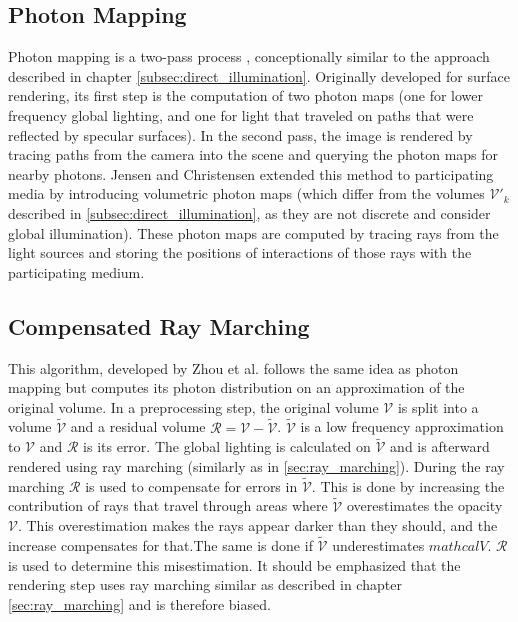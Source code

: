 \subsection{Photon Mapping}
Photon mapping is a two-pass process \cite{10.1145/280814.280925}, conceptionally similar to the approach described in chapter \ref{subsec:direct_illumination}. Originally developed for surface rendering\cite{10.5555/275458.275461}, its first step is the computation of two photon maps\cite{10.1145/280814.280925} (one for lower frequency global lighting, and one for light that traveled on paths that were reflected by specular surfaces). In the second pass, the image is rendered by tracing paths from the camera into the scene and querying the photon maps for nearby photons.
Jensen and Christensen \cite{10.1145/280814.280925} extended this method to participating media by introducing volumetric photon maps (which differ from the volumes $\mathcal{V}'_k$ described in \ref{subsec:direct_illumination}, as they are not discrete and consider global illumination). These photon maps are computed by tracing rays from the light sources and storing the positions of interactions of those rays with the participating medium.
\subsection{Compensated Ray Marching}
This algorithm, developed by Zhou et al. \cite{zhou2007real-time} follows the same idea as photon mapping but computes its photon distribution on an approximation of the original volume.
In a preprocessing step, the original volume $\mathcal{V}$ is split into a volume $\widetilde{\mathcal{V}}$ and a residual volume $\mathcal{R} = \mathcal{V} - \widetilde{\mathcal{V}}$. $\widetilde{\mathcal{V}}$ is a low frequency approximation to $\mathcal{V}$ and $\mathcal{R}$ is its error. The global lighting is calculated on $\widetilde{\mathcal{V}}$ and is afterward rendered using ray marching (similarly as in \ref{sec:ray_marching}). During the ray marching $\mathcal{R}$ is used to compensate for errors in $\widetilde{\mathcal{V}}$. This is done by increasing the contribution of rays that travel through areas where $\widetilde{\mathcal{V}}$ overestimates the opacity $\mathcal{V}$. This overestimation makes the rays appear darker than they should, and the increase compensates for that.The same is done if $\widetilde{\mathcal{V}}$ underestimates $mathcal{V}$. $\mathcal{R}$ is used to determine this misestimation. 
It should be emphasized that the rendering step uses ray marching similar as described in chapter \ref{sec:ray_marching} and is therefore biased. 
